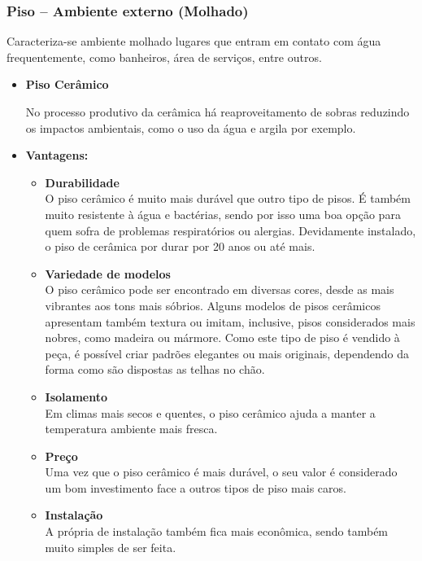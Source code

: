 \subsubsection{Piso – Ambiente externo (Molhado)}
	Caracteriza-se ambiente molhado lugares que entram em contato com água frequentemente, como banheiros, área de serviços, entre outros.

\begin{itemize}

\item \textbf{Piso Cerâmico}

	No processo produtivo da cerâmica há reaproveitamento de sobras reduzindo os impactos ambientais, como o uso da água e argila por exemplo.

\item \textbf{Vantagens:}
\begin{itemize}
\item \textbf{Durabilidade}\\O piso cerâmico é muito mais durável que outro tipo de pisos. É também muito resistente à água e bactérias, sendo por isso uma boa opção para quem sofra de problemas respiratórios ou alergias. Devidamente instalado, o piso de cerâmica por durar por 20 anos ou até mais.

\item \textbf{Variedade de modelos}\\O piso cerâmico pode ser encontrado em diversas cores, desde as mais vibrantes aos tons mais sóbrios. Alguns modelos de pisos cerâmicos apresentam também textura ou imitam, inclusive, pisos considerados mais nobres, como madeira ou mármore. Como este tipo de piso é vendido à peça, é possível criar padrões elegantes ou mais originais, dependendo da forma como são dispostas as telhas no chão.

\item \textbf{Isolamento}\\Em climas mais secos e quentes, o piso cerâmico ajuda a manter a temperatura ambiente mais fresca.

\item \textbf{Preço}\\Uma vez que o piso cerâmico é mais durável, o seu valor é considerado um bom investimento face a outros tipos de piso mais caros.

\item \textbf{Instalação}\\A própria de instalação também fica mais econômica, sendo também muito simples de ser feita.


\end{itemize}
\end{itemize}
